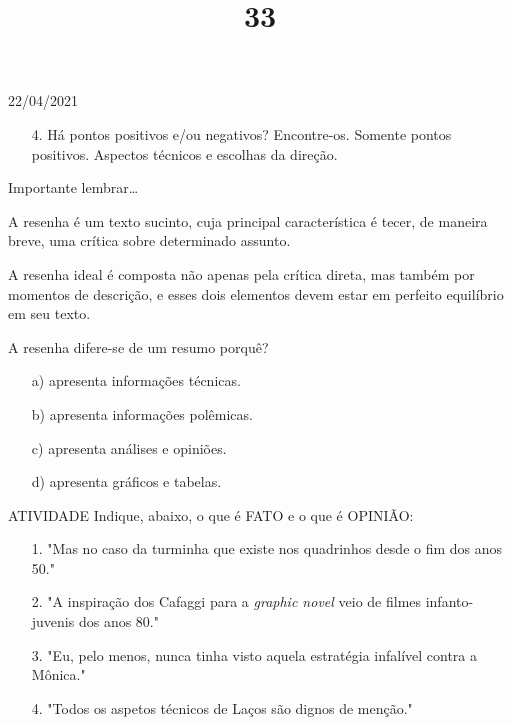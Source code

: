 \documentclass{SchoolBook}
\begin{document}
\begin{day}{22/04/2021}
\begin{enumerate}
            \item[4.] Há pontos positivos e/ou negativos? Encontre-os.
            \response Somente pontos positivos. Aspectos técnicos e escolhas da direção.
        \end{enumerate}

        \title{3}{Importante lembrar\dots}

        A resenha é um texto sucinto, cuja principal característica é tecer, de maneira breve, uma crítica sobre determinado assunto.

        A resenha ideal é composta não apenas pela crítica direta, mas também por momentos de descrição, e esses dois elementos devem estar em perfeito equilíbrio em seu texto.
        
        \vspace{3pt}
        A resenha difere-se de um resumo porquê?
        \vspace{3pt}

        \begin{enumerate}[nosep]
            \item[a)] apresenta informações técnicas.
            \item[b)] apresenta informações polêmicas.
        \bf \item[c)] apresenta análises e opiniões. \normalfont
            \item[d)] apresenta gráficos e tabelas.
        \end{enumerate}

        \title{3}{ATIVIDADE}
        Indique, abaixo, o que é FATO e o que é OPINIÃO:
        \vspace{3pt}

        \begin{enumerate}[nosep]
        \bf \item[1.] "Mas no caso da turminha que existe nos quadrinhos desde o fim dos anos 50." \normalfont
        \bf \item[2.] "A inspiração dos Cafaggi para a \emph{graphic novel} veio de filmes infanto-juvenis dos anos 80." \normalfont
            \item[3.] "Eu, pelo menos, nunca tinha visto aquela estratégia infalível contra a Mônica."
            \item[4.] "Todos os aspetos técnicos de Laços são dignos de menção."
        \end{enumerate}
    \end{day}
\end{document}
